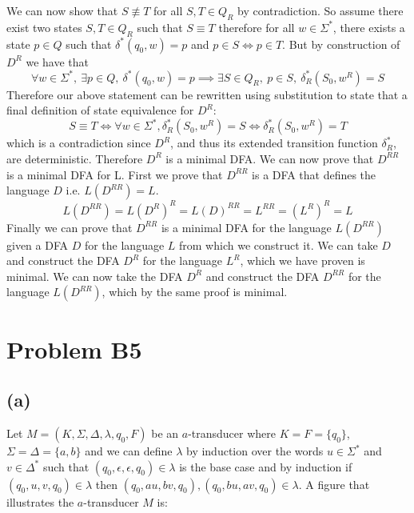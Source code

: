 \documentclass[12pt]{article}
\begin{document}
We can now show that $S \not\equiv T$ for all $S,T \in Q_R$ by contradiction.
So assume there exist two states $S,T \in Q_R$ such that $S \equiv T$ therefore
for all $w \in \Sigma^*$, there exists a state $p \in Q$ such that
$\delta^*(q_0,w) = p$ and $p \in S \iff p \in T$. But by construction of $D^R$
we have that
$$\forall w \in \Sigma^*,\ \exists p \in Q,\ \delta^*(q_0, w) = p \implies
\exists S \in Q_R,\ p \in S,\ \delta_R^*(S_0, w^R) = S$$
Therefore our above statement can be rewritten using substitution to state that
a final definition of state equivalence for $D^R$:
$$ S \equiv T \iff \forall w \in \Sigma^*,
\delta_R^*(S_0, w^R) = S \iff \delta_R^*(S_0, w^R) = T$$
which is a contradiction since $D^R$, and thus its extended transition function
$\delta_R^*$, are deterministic. Therefore $D^R$ is a minimal DFA.
\medskip
\newline
We can now prove that $D^{RR}$ is a minimal DFA for L. First we prove
that $D^{RR}$ is a DFA that defines the language $D$ i.e. $L(D^{RR}) = L$.
$$L(D^{RR}) = L(D^R)^R = L(D)^{RR} = L^{RR} = (L^R)^R = L$$
Finally we can prove that $D^{RR}$ is a minimal DFA for the language $L(D^{RR})$
given a DFA $D$ for the language $L$ from which we construct it. We can take
$D$ and construct the DFA $D^R$ for the language $L^R$, which we have proven is
minimal. We can now take the DFA $D^R$ and construct the DFA $D^{RR}$ for
the language $L(D^{RR})$, which by the same proof is minimal.

\newpage
\section*{Problem B5}
\subsection*{(a)}
Let $M = (K, \Sigma, \Delta, \lambda, q_0, F)$ be an $a$-transducer where
$K = F = \{q_0\}$, $\Sigma = \Delta = \{a,b\}$ and we can define $\lambda$
by induction over the words $u\in \Sigma^*$ and $v \in \Delta^*$ such that
$(q_0, \epsilon, \epsilon, q_0) \in \lambda$ is the base case and by induction
if $(q_0, u, v, q_0) \in \lambda$ then $(q_0,au,bv,q_0), (q_0,bu,av,q_0) \in
\lambda$. A figure that illustrates the $a$-transducer $M$ is:
\begin{center}
\end{center}
\end{document}

